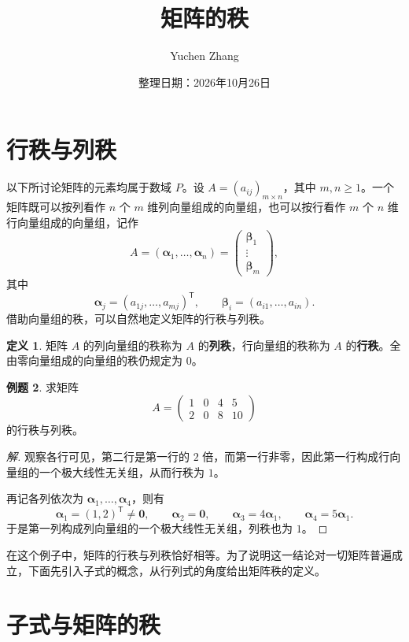 \documentclass[UTF8, fontset=fandol, a4paper, 12pt]{ctexart}
\title{矩阵的秩}
\author{Yuchen Zhang}
\date{整理日期：2026年10月26日}
\makeatletter
\theoremstyle{definition}
\newtheorem{definition}{定义}[section]
\newtheorem{example}[definition]{例题}
\renewcommand{\maketitle}{%
  \begin{center}
    {\LARGE\bfseries \@title\par}\vspace{0.6em}
    \@author\par\vspace{0.2em}
    {\small \@date\par}
  \end{center}
}
\makeatother
\begin{document}
\maketitle

\section{行秩与列秩}

以下所讨论矩阵的元素均属于数域 $P$。设 $A=(a_{ij})_{m\times n}$，其中 $m,n\ge1$。一个矩阵既可以按列看作 $n$ 个 $m$ 维列向量组成的向量组，也可以按行看作 $m$ 个 $n$ 维行向量组成的向量组，记作
\[
 A=(\boldsymbol\alpha_1,\ldots,\boldsymbol\alpha_n)
 =\begin{pmatrix}\boldsymbol\beta_1\\\vdots\\\boldsymbol\beta_m\end{pmatrix},
\]
其中
\[
 \boldsymbol\alpha_j=(a_{1j},\ldots,a_{mj})^{\mathsf T},\qquad
 \boldsymbol\beta_i=(a_{i1},\ldots,a_{in}).
\]
借助向量组的秩，可以自然地定义矩阵的行秩与列秩。

\begin{definition}
矩阵 $A$ 的列向量组的秩称为 $A$ 的\textbf{列秩}，行向量组的秩称为 $A$ 的\textbf{行秩}。全由零向量组成的向量组的秩仍规定为 $0$。
\end{definition}

\begin{example}
求矩阵
\[
 A=\begin{pmatrix}1&0&4&5\\2&0&8&10\end{pmatrix}
\]
的行秩与列秩。
\end{example}
\begin{proof}[解]
观察各行可见，第二行是第一行的 $2$ 倍，而第一行非零，因此第一行构成行向量组的一个极大线性无关组，从而行秩为 $1$。

再记各列依次为 $\boldsymbol\alpha_1,\ldots,\boldsymbol\alpha_4$，则有
\[
 \boldsymbol\alpha_1=(1,2)^{\mathsf T}\ne\boldsymbol0,\qquad
 \boldsymbol\alpha_2=\boldsymbol0,\qquad
 \boldsymbol\alpha_3=4\boldsymbol\alpha_1,\qquad
 \boldsymbol\alpha_4=5\boldsymbol\alpha_1.
\]
于是第一列构成列向量组的一个极大线性无关组，列秩也为 $1$。
\end{proof}

在这个例子中，矩阵的行秩与列秩恰好相等。为了说明这一结论对一切矩阵普遍成立，下面先引入子式的概念，从行列式的角度给出矩阵秩的定义。

\section{子式与矩阵的秩}
\end{document}
